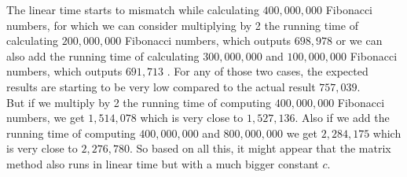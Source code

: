 \documentclass[12pt]{scrartcl}
\begin{document}
\begin{enumerate}
The linear time starts to mismatch while calculating $400,000, 000$ Fibonacci numbers, for which we can consider multiplying by 2 the running time of calculating $200,000,000$ Fibonacci numbers, which outputs $698,978$ or we can also add the running time of calculating $300,000,000$ and $100, 000, 000$ Fibonacci numbers, which outputs $691,713$ . For any of those two cases, the expected results are starting to be very low compared to the actual result $757, 039$. \\
But if we multiply by 2 the running time of computing $400,000,000$ Fibonacci numbers, we get $1,514,078$ which is very close to $1,527,136$. Also if we add the running time of computing $400,000,000$ and $800,000,000$ we get $2,284,175$ which is very close to $2,276,780$. So based on all this, it might appear that the matrix method also runs in linear time but with a much bigger constant $c$.


\end{enumerate}
\end{document}
